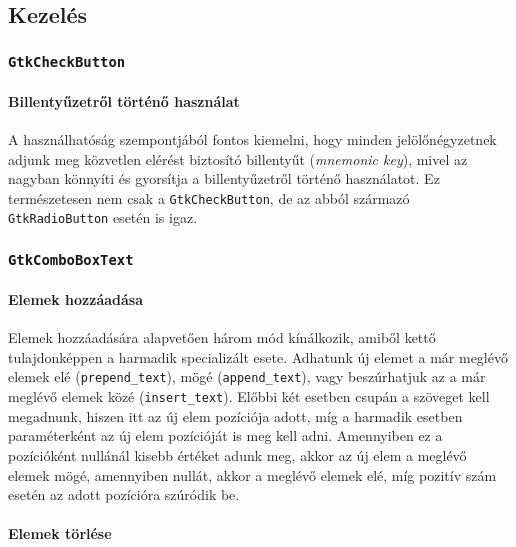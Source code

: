 \subsection{Kezelés}

\subsubsection{\texttt{GtkCheckButton}}

\paragraph{Billentyűzetről történő használat}

A használhatóság szempontjából fontos kiemelni, hogy minden jelölőnégyzetnek adjunk meg közvetlen elérést biztosító billentyűt (\textit{mnemonic key}), mivel az nagyban könnyíti és gyorsítja a billentyűzetről történő használatot. Ez természetesen nem csak a \texttt{GtkCheckButton}, de az abból származó \texttt{GtkRadioButton} esetén is igaz.

\subsubsection{\texttt{GtkComboBoxText}}

\paragraph{Elemek hozzáadása}

Elemek hozzáadására alapvetően három mód kínálkozik, amiből kettő tulajdonképpen a harmadik specializált esete. Adhatunk új elemet a már meglévő elemek elé (\texttt{prepend\_text}), mögé (\texttt{append\_text}), vagy beszúrhatjuk az a már meglévő elemek közé (\texttt{insert\_text}). Előbbi két esetben csupán a szöveget kell megadnunk, hiszen itt az új elem pozíciója adott, míg a harmadik esetben paraméterként az új elem pozícióját is meg kell adni. Amennyiben ez a pozícióként nullánál kisebb értéket adunk meg, akkor az új elem a meglévő elemek mögé, amennyiben nullát, akkor a meglévő elemek elé, míg pozitív szám esetén az adott pozícióra szúródik be.

\paragraph{Elemek törlése}

